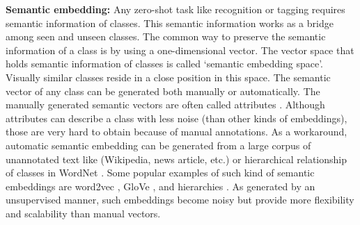\documentclass[runningheads]{llncs}
\begin{document}
\textbf{Semantic embedding:} Any zero-shot task like recognition or tagging requires semantic information of classes. This semantic information works as a bridge among seen and unseen classes. The common way to preserve the semantic information of a class is by using a one-dimensional vector. The vector space that holds semantic information of classes is called `semantic embedding space'. Visually similar classes reside in a close position in this space. The semantic vector of any class can be generated both manually or automatically. The manually generated semantic vectors are often called attributes \cite{CUB_2011,Lampert_PAMI_2014}. Although attributes can describe a class with less noise (than other kinds of embeddings), those are very hard to obtain because of manual annotations. As a workaround, automatic semantic embedding can be generated from a large corpus of unannotated text like (Wikipedia, news article, etc.) or hierarchical relationship of classes in WordNet \cite{Wordnet_1995}. Some popular examples of such kind of semantic embeddings are word2vec \cite{Mikolov_NIPS_2013}, GloVe \cite{Jeffrey_Glove_2014}, and hierarchies \cite{Xian_2016_CVPR}. As generated by an unsupervised manner, such embeddings become noisy but provide more flexibility and scalability than manual vectors.
\end{document}
